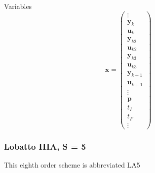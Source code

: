 \documentclass[]{article}
\begin{document}
\noindent Variables 
\begin{equation}
    \mathbf{x} = \begin{pmatrix}
        \vdots \\ \mathbf{y}_k \\ \mathbf{u}_k \\ \mathbf{y}_{k2} \\ \mathbf{u}_{k2} \\ \mathbf{y}_{k3} \\ \mathbf{u}_{k3} \\ \mathbf{y}_{k+1} \\ \mathbf{u}_{k+1} \\ \vdots \\ \mathbf{p} \\ t_I \\ t_F \\ \vdots
    \end{pmatrix}
\end{equation}

\subsubsection{Lobatto IIIA, S = 5}
This eighth order scheme is abbreviated LA5 \vspace{2mm} 
\end{document}

